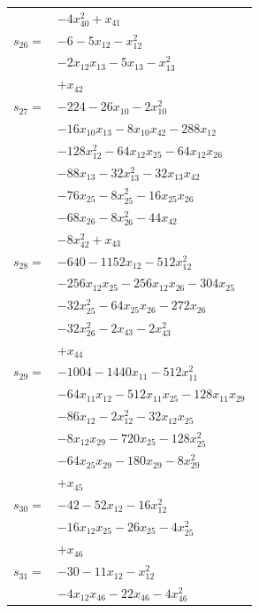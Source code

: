 \begin{longtable}{@{}r@{\;}l@{}}
 & \(\displaystyle -4x_{40}^{2} +x_{41}\) \\[3pt]
\(s_{26}=\) & \(\displaystyle -6 -5x_{12} -x_{12}^{2}\) \\
 & \(\displaystyle -2x_{12}x_{13} -5x_{13} -x_{13}^{2}\) \\
 & \(\displaystyle +x_{42}\) \\[3pt]
\(s_{27}=\) & \(\displaystyle -224 -26x_{10} -2x_{10}^{2}\) \\
 & \(\displaystyle -16x_{10}x_{13} -8x_{10}x_{42} -288x_{12}\) \\
 & \(\displaystyle -128x_{12}^{2} -64x_{12}x_{25} -64x_{12}x_{26}\) \\
 & \(\displaystyle -88x_{13} -32x_{13}^{2} -32x_{13}x_{42}\) \\
 & \(\displaystyle -76x_{25} -8x_{25}^{2} -16x_{25}x_{26}\) \\
 & \(\displaystyle -68x_{26} -8x_{26}^{2} -44x_{42}\) \\
 & \(\displaystyle -8x_{42}^{2} +x_{43}\) \\[3pt]
\(s_{28}=\) & \(\displaystyle -640 -1152x_{12} -512x_{12}^{2}\) \\
 & \(\displaystyle -256x_{12}x_{25} -256x_{12}x_{26} -304x_{25}\) \\
 & \(\displaystyle -32x_{25}^{2} -64x_{25}x_{26} -272x_{26}\) \\
 & \(\displaystyle -32x_{26}^{2} -2x_{43} -2x_{43}^{2}\) \\
 & \(\displaystyle +x_{44}\) \\[3pt]
\(s_{29}=\) & \(\displaystyle -1004 -1440x_{11} -512x_{11}^{2}\) \\
 & \(\displaystyle -64x_{11}x_{12} -512x_{11}x_{25} -128x_{11}x_{29}\) \\
 & \(\displaystyle -86x_{12} -2x_{12}^{2} -32x_{12}x_{25}\) \\
 & \(\displaystyle -8x_{12}x_{29} -720x_{25} -128x_{25}^{2}\) \\
 & \(\displaystyle -64x_{25}x_{29} -180x_{29} -8x_{29}^{2}\) \\
 & \(\displaystyle +x_{45}\) \\[3pt]
\(s_{30}=\) & \(\displaystyle -42 -52x_{12} -16x_{12}^{2}\) \\
 & \(\displaystyle -16x_{12}x_{25} -26x_{25} -4x_{25}^{2}\) \\
 & \(\displaystyle +x_{46}\) \\[3pt]
\(s_{31}=\) & \(\displaystyle -30 -11x_{12} -x_{12}^{2}\) \\
 & \(\displaystyle -4x_{12}x_{46} -22x_{46} -4x_{46}^{2}\) \\

\end{longtable}
